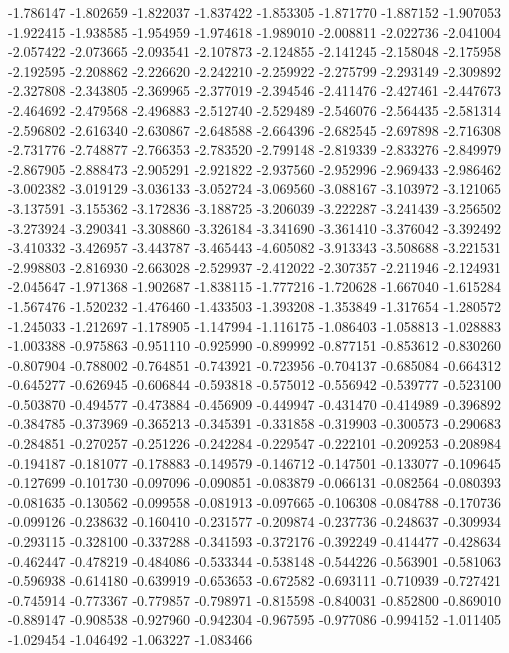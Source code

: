 -1.786147
-1.802659
-1.822037
-1.837422
-1.853305
-1.871770
-1.887152
-1.907053
-1.922415
-1.938585
-1.954959
-1.974618
-1.989010
-2.008811
-2.022736
-2.041004
-2.057422
-2.073665
-2.093541
-2.107873
-2.124855
-2.141245
-2.158048
-2.175958
-2.192595
-2.208862
-2.226620
-2.242210
-2.259922
-2.275799
-2.293149
-2.309892
-2.327808
-2.343805
-2.369965
-2.377019
-2.394546
-2.411476
-2.427461
-2.447673
-2.464692
-2.479568
-2.496883
-2.512740
-2.529489
-2.546076
-2.564435
-2.581314
-2.596802
-2.616340
-2.630867
-2.648588
-2.664396
-2.682545
-2.697898
-2.716308
-2.731776
-2.748877
-2.766353
-2.783520
-2.799148
-2.819339
-2.833276
-2.849979
-2.867905
-2.888473
-2.905291
-2.921822
-2.937560
-2.952996
-2.969433
-2.986462
-3.002382
-3.019129
-3.036133
-3.052724
-3.069560
-3.088167
-3.103972
-3.121065
-3.137591
-3.155362
-3.172836
-3.188725
-3.206039
-3.222287
-3.241439
-3.256502
-3.273924
-3.290341
-3.308860
-3.326184
-3.341690
-3.361410
-3.376042
-3.392492
-3.410332
-3.426957
-3.443787
-3.465443
-4.605082
-3.913343
-3.508688
-3.221531
-2.998803
-2.816930
-2.663028
-2.529937
-2.412022
-2.307357
-2.211946
-2.124931
-2.045647
-1.971368
-1.902687
-1.838115
-1.777216
-1.720628
-1.667040
-1.615284
-1.567476
-1.520232
-1.476460
-1.433503
-1.393208
-1.353849
-1.317654
-1.280572
-1.245033
-1.212697
-1.178905
-1.147994
-1.116175
-1.086403
-1.058813
-1.028883
-1.003388
-0.975863
-0.951110
-0.925990
-0.899992
-0.877151
-0.853612
-0.830260
-0.807904
-0.788002
-0.764851
-0.743921
-0.723956
-0.704137
-0.685084
-0.664312
-0.645277
-0.626945
-0.606844
-0.593818
-0.575012
-0.556942
-0.539777
-0.523100
-0.503870
-0.494577
-0.473884
-0.456909
-0.449947
-0.431470
-0.414989
-0.396892
-0.384785
-0.373969
-0.365213
-0.345391
-0.331858
-0.319903
-0.300573
-0.290683
-0.284851
-0.270257
-0.251226
-0.242284
-0.229547
-0.222101
-0.209253
-0.208984
-0.194187
-0.181077
-0.178883
-0.149579
-0.146712
-0.147501
-0.133077
-0.109645
-0.127699
-0.101730
-0.097096
-0.090851
-0.083879
-0.066131
-0.082564
-0.080393
-0.081635
-0.130562
-0.099558
-0.081913
-0.097665
-0.106308
-0.084788
-0.170736
-0.099126
-0.238632
-0.160410
-0.231577
-0.209874
-0.237736
-0.248637
-0.309934
-0.293115
-0.328100
-0.337288
-0.341593
-0.372176
-0.392249
-0.414477
-0.428634
-0.462447
-0.478219
-0.484086
-0.533344
-0.538148
-0.544226
-0.563901
-0.581063
-0.596938
-0.614180
-0.639919
-0.653653
-0.672582
-0.693111
-0.710939
-0.727421
-0.745914
-0.773367
-0.779857
-0.798971
-0.815598
-0.840031
-0.852800
-0.869010
-0.889147
-0.908538
-0.927960
-0.942304
-0.967595
-0.977086
-0.994152
-1.011405
-1.029454
-1.046492
-1.063227
-1.083466
